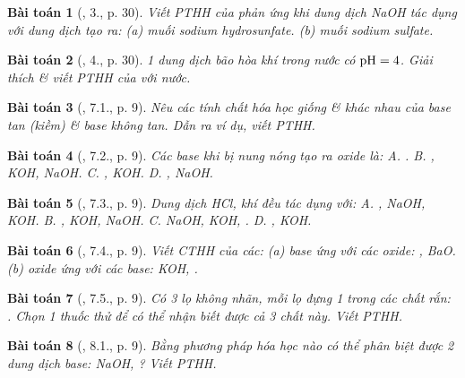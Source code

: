 \documentclass{article}
\newtheorem{baitoan}{Bài toán}
\begin{document}
\begin{baitoan}[\cite{SGK_Hoa_Hoc_9}, 3., p. 30]
	Viết {\rm PTHH} của phản ứng khi dung dịch {\rm NaOH} tác dụng với dung dịch {\rm{}} tạo ra: (a) muối sodium hydrosunfate. (b) muối sodium sulfate.
\end{baitoan}

\begin{baitoan}[\cite{SGK_Hoa_Hoc_9}, 4., p. 30]
	1 dung dịch bão hòa khí {\rm{}} trong nước có $\rm pH = 4$. Giải thích \& viết {\rm PTHH} của {\rm{}} với nước.
\end{baitoan}

\begin{baitoan}[\cite{SGK_Hoa_Hoc_9}, 7.1., p. 9]
	Nêu các tính chất hóa học giống \& khác nhau của base tan (kiềm) \& base không tan. Dẫn ra ví dụ, viết PTHH.
\end{baitoan}

\begin{baitoan}[\cite{SGK_Hoa_Hoc_9}, 7.2., p. 9]
	Các base khi bị nung nóng tạo ra oxide là: {\sf A.} {\rm{}}. {\sf B.} {\rm{}, KOH, NaOH}. {\sf C.} {\rm{}, KOH}. {\sf D.} {\rm{}, NaOH}.
\end{baitoan}

\begin{baitoan}[\cite{SGK_Hoa_Hoc_9}, 7.3., p. 9]
	Dung dịch {\rm HCl}, khí {\rm{}} đều tác dụng với: {\sf A.} {\rm{}, NaOH, KOH}. {\sf B.} {\rm{}, KOH, NaOH}. {\sf C.} {\rm NaOH, KOH, }. {\sf D.} {\rm{}, KOH}.
\end{baitoan}

\begin{baitoan}[\cite{SGK_Hoa_Hoc_9}, 7.4., p. 9]
	Viết CTHH của các: (a) base ứng với các oxide: {\rm{}, BaO}. (b) oxide ứng với các base: {\rm KOH, }.
\end{baitoan}

\begin{baitoan}[\cite{SGK_Hoa_Hoc_9}, 7.5., p. 9]
	Có 3 lọ không nhãn, mỗi lọ đựng 1 trong các chất rắn: {\rm{}}. Chọn 1 thuốc thử để có thể nhận biết được cả 3 chất này. Viết {\rm PTHH}.
\end{baitoan}

\begin{baitoan}[\cite{SGK_Hoa_Hoc_9}, 8.1., p. 9]
	Bằng phương pháp hóa học nào có thể phân biệt được 2 dung dịch base: {\rm NaOH, }? Viết PTHH.
\end{baitoan}
\end{document}

